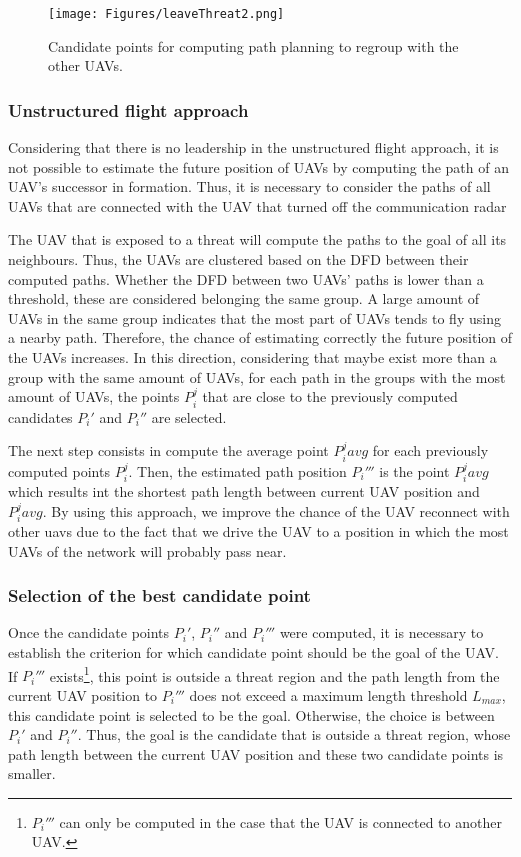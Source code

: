 \begin{figure}[h!]
\centering
\texttt{[image: Figures/leaveThreat2.png]}
\caption{Candidate points for computing path planning to regroup with the other UAVs.}
\label{fig:LeaveThreat2}
\end{figure}

\subsubsection{Unstructured flight approach}

Considering that there is no leadership in the unstructured flight approach, it is not possible to estimate the future position of UAVs by computing the path of an UAV's successor in formation. Thus, it is necessary to consider the paths of all UAVs that are connected with the UAV that turned off the communication radar

The UAV that is exposed to a threat will compute the paths to the goal of all its neighbours. Thus, the UAVs are clustered based on the DFD between their computed paths. Whether the DFD between two UAVs' paths is lower than a threshold, these are considered belonging the same group. A large amount of UAVs in the same group indicates that the most part of UAVs tends to fly using a nearby path. Therefore, the chance of estimating correctly the future position of the UAVs increases. In this direction, considering that maybe exist more than a group with the same amount of UAVs, for each path in the groups with the most amount of UAVs, the points $P_i^j$ that are close to the previously computed candidates $P_i'$ and $P_i''$ are selected. 

The next step consists in compute the average point $P_i^javg$ for each previously computed points $P_i^j$. Then, the estimated path position $P_i'''$ is the point $P_i^javg$ which results int the shortest path length between current UAV position and $P_i^javg$. By using this approach, we improve the chance of the UAV reconnect with other uavs due to the fact that we drive the UAV to a position in which the most UAVs of the network will probably pass near.

\subsubsection{Selection of the best candidate point}

Once the candidate points $P_i'$, $P_i''$ and $P_i'''$ were computed, it is necessary to establish the criterion for which candidate point should be the goal of the UAV. If $P_i'''$ exists\footnote{$P_i'''$ can only be computed in the case that the UAV is connected to another UAV.}, this point is outside a threat region and the path length from the current UAV position to $P_i'''$ does not exceed a maximum length threshold $L_{max}$, this candidate point is selected to be the goal. Otherwise, the choice is between $P_i'$ and $P_i''$. Thus, the goal is the candidate that is outside a threat region, whose path length between the current UAV position and these two candidate points is smaller. 


